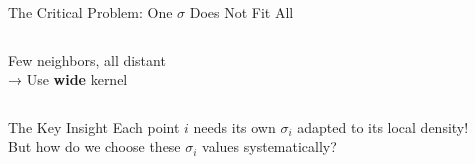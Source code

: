\documentclass[10pt]{beamer}
\begin{document}
\begin{frame}{The Critical Problem: One $\sigma$ Does Not Fit All}
\begin{columns}
\begin{column}{0.5\textwidth}
\vspace{0.2cm}
Few neighbors, all distant\\
→ Use \textbf{wide} kernel

\end{column}
\end{columns}

\vspace{0.3cm}

\begin{alertblock}{The Key Insight}
Each point $i$ needs its own $\sigma_i$ adapted to its local density!\\
But how do we choose these $\sigma_i$ values systematically?
\end{alertblock}

\end{frame}
\end{document}
